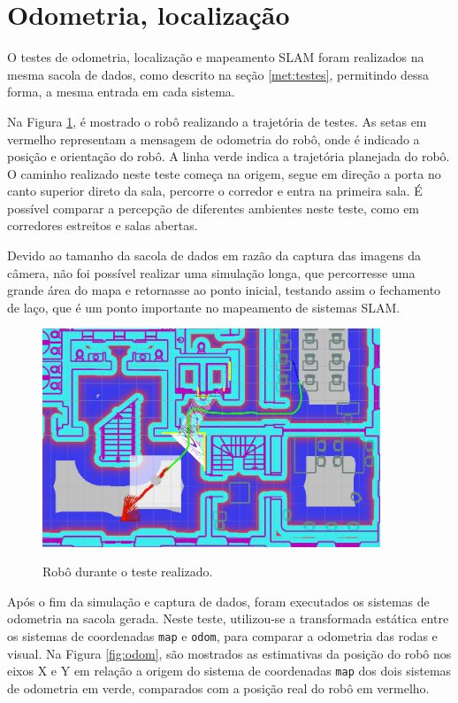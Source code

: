 \documentclass[repeatfields,xlists,xpacks,oneside,yearsonly]{ufrgscca}
\begin{document}
\section{Odometria, localização}

O testes de odometria, localização e mapeamento SLAM foram realizados na mesma
sacola de dados, como descrito na seção \ref{met:testes},
permitindo dessa forma, a mesma entrada em cada sistema.

Na Figura \ref{fig:base_bag}, é mostrado o robô realizando a trajetória
de testes. As setas em vermelho representam a mensagem de odometria do
robô, onde é indicado a posição e orientação do robô. A linha verde indica
a trajetória planejada do robô.
O caminho realizado neste teste começa na origem, segue em direção a porta
no canto superior direto da sala, percorre o corredor e entra na primeira
sala.
É possível comparar a percepção de diferentes ambientes neste teste, como
em corredores estreitos e salas abertas.

Devido ao tamanho da sacola de dados em razão da captura das imagens
da câmera, não foi possível realizar uma simulação longa, que percorresse
uma grande área do mapa e retornasse ao ponto inicial, testando assim o
fechamento de laço, que é um ponto importante no mapeamento de sistemas
SLAM.

\begin{figure}[h]
    {
        \centering
        \caption{Robô durante o teste realizado.}
        \label{fig:base_bag}
        \includegraphics[width=0.9\textwidth]{base_bag_sim_zoom.png}\\
    }
\end{figure}

Após o fim da simulação e captura de dados, foram executados os
sistemas de odometria na sacola gerada.
Neste teste, utilizou-se a transformada estática entre os sistemas
de coordenadas \texttt{map} e \texttt{odom}, para comparar a odometria
das rodas e visual.
Na Figura \ref{fig:odom}, são mostrados as estimativas da posição do robô
nos eixos X e Y em relação a origem do sistema de coordenadas \texttt{map}
dos dois sistemas de odometria em verde, comparados com a posição real do
robô em vermelho.
\end{document}
